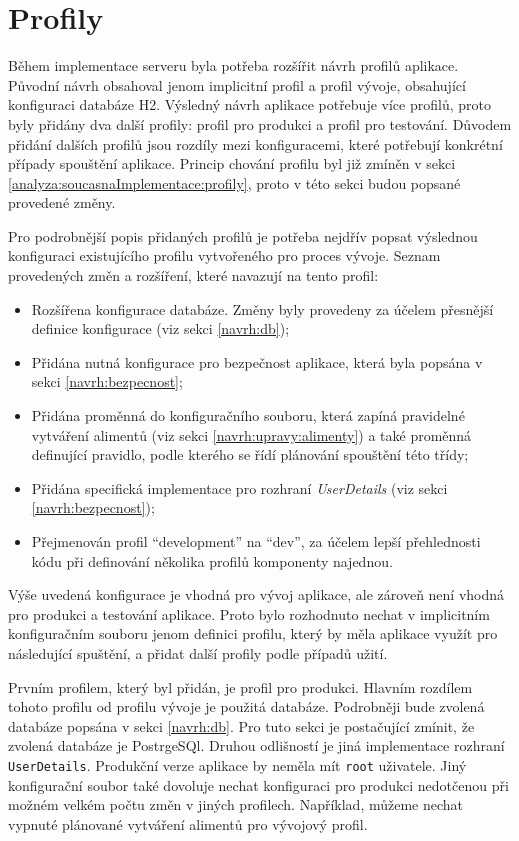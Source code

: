 \section{Profily}\label{navrh:profily}
    Během implementace serveru byla potřeba rozšířit návrh profilů aplikace. Původní návrh obsahoval jenom implicitní profil a profil vývoje, obsahující konfiguraci databáze H2. Výsledný návrh aplikace potřebuje více profilů, proto byly přidány dva další profily: profil pro produkci a profil pro testování. Důvodem přidání dalších profilů jsou rozdíly mezi konfiguracemi, které potřebují konkrétní případy spouštění aplikace. Princip chování profilu byl již zmíněn v sekci \ref{analyza:soucasnaImplementace:profily}, proto v této sekci budou popsané provedené změny.
    
    Pro podrobnější popis přidaných profilů je potřeba nejdřív popsat výslednou konfiguraci existujícího profilu vytvořeného pro proces vývoje. Seznam provedených změn a rozšíření, které navazují na tento profil:
    \begin{itemize}
            \item Rozšířena konfigurace databáze. Změny byly provedeny za účelem přesnější definice konfigurace (viz sekci \ref{navrh:db});
            \item Přidána nutná konfigurace pro bezpečnost aplikace, která byla popsána v sekci \ref{navrh:bezpecnost};
            \item Přidána proměnná do konfiguračního souboru, která zapíná pravidelné vytváření alimentů (viz sekci \ref{navrh:upravy:alimenty}) a také proměnná definující pravidlo, podle kterého se řídí plánování spouštění této třídy;
            \item Přidána specifická implementace pro rozhraní \textit{UserDetails} (viz sekci \ref{navrh:bezpecnost});
            \item Přejmenován profil \enquote{development} na \enquote{dev}, za účelem lepší přehlednosti kódu při definování několika profilů komponenty najednou.
    \end{itemize}
    
    Výše uvedená konfigurace je vhodná pro vývoj aplikace, ale zároveň není vhodná pro produkci a testování aplikace. Proto bylo rozhodnuto nechat v implicitním konfiguračním souboru jenom definici profilu, který by měla aplikace využít pro následující spuštění, a přidat další profily podle případů užití.
    
    Prvním profilem, který byl přidán, je profil pro produkci. Hlavním rozdílem tohoto profilu od profilu vývoje je použitá databáze. Podrobněji bude zvolená databáze popsána v sekci \ref{navrh:db}. Pro tuto sekci je postačující zmínit, že zvolená databáze je PostrgeSQl. Druhou odlišností je jiná implementace rozhraní \verb|UserDetails|. Produkční verze aplikace by neměla mít \verb|root| uživatele. Jiný konfigurační soubor také dovoluje nechat konfiguraci pro produkci nedotčenou při možném velkém počtu změn v jiných profilech.
    Například, můžeme nechat vypnuté plánované vytváření alimentů pro vývojový profil.
    
